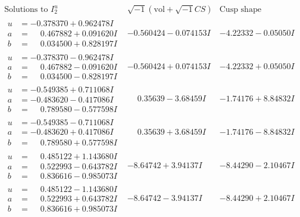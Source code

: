 \documentclass[1p]{elsarticle_modified}
\theoremstyle{definition}
\newcommand{\I}{\sqrt{-1}}
\begin{document}
$$\begin{array}{c|c|c}  
\text{Solutions to }I^u_{2}& \I (\text{vol} + \sqrt{-1}CS) & \text{Cusp shape}\\
 \hline 
\begin{aligned}
u &= -0.378370 + 0.962478 I \\
a &= \phantom{-}0.467882 + 0.091620 I \\
b &= \phantom{-}0.034500 + 0.828197 I\end{aligned}
 & -0.560424 - 0.074153 I & -4.22332 - 0.05050 I \\ \hline\begin{aligned}
u &= -0.378370 - 0.962478 I \\
a &= \phantom{-}0.467882 - 0.091620 I \\
b &= \phantom{-}0.034500 - 0.828197 I\end{aligned}
 & -0.560424 + 0.074153 I & -4.22332 + 0.05050 I \\ \hline\begin{aligned}
u &= -0.549385 + 0.711068 I \\
a &= -0.483620 - 0.417086 I \\
b &= \phantom{-}0.789580 - 0.577598 I\end{aligned}
 & \phantom{-}0.35639 - 3.68459 I & -1.74176 + 8.84832 I \\ \hline\begin{aligned}
u &= -0.549385 - 0.711068 I \\
a &= -0.483620 + 0.417086 I \\
b &= \phantom{-}0.789580 + 0.577598 I\end{aligned}
 & \phantom{-}0.35639 + 3.68459 I & -1.74176 - 8.84832 I \\ \hline\begin{aligned}
u &= \phantom{-}0.485122 + 1.143680 I \\
a &= \phantom{-}0.522993 - 0.643782 I \\
b &= \phantom{-}0.836616 - 0.985073 I\end{aligned}
 & -8.64742 + 3.94137 I & -8.44290 - 2.10467 I \\ \hline\begin{aligned}
u &= \phantom{-}0.485122 - 1.143680 I \\
a &= \phantom{-}0.522993 + 0.643782 I \\
b &= \phantom{-}0.836616 + 0.985073 I\end{aligned}
 & -8.64742 - 3.94137 I & -8.44290 + 2.10467 I \\ \hline\begin{aligned}

\end{aligned}
\end{array}$$
\end{document}
